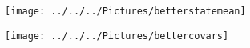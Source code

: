 \documentclass[english]{article}
\numberwithin{equation}{section}
\begin{document}
	
	
		\begin{figure}
		\centering
		\texttt{[image: ../../../Pictures/betterstatemean]}
		\caption[Emission matrix]{}
		\label{fig:emissionmeans}
	\end{figure}

	\begin{figure}
	\centering
	\texttt{[image: ../../../Pictures/bettercovars]}
	\caption[Emission matrix covariances]{}
	\label{fig:emissioncovars}
	\end{figure}
	
\end{document}
